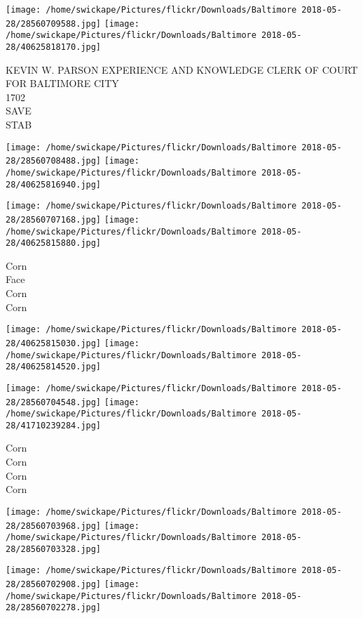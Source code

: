 \documentclass[10pt,letterpaper]{article}
\begin{document}
\texttt{[image: /home/swickape/Pictures/flickr/Downloads/Baltimore 2018-05-28/28560709588.jpg]}
\texttt{[image: /home/swickape/Pictures/flickr/Downloads/Baltimore 2018-05-28/40625818170.jpg]}

KEVIN W. PARSON EXPERIENCE AND KNOWLEDGE CLERK OF COURT FOR BALTIMORE CITY\\
1702\\
SAVE\\
STAB\\
\pagebreak

\texttt{[image: /home/swickape/Pictures/flickr/Downloads/Baltimore 2018-05-28/28560708488.jpg]}
\texttt{[image: /home/swickape/Pictures/flickr/Downloads/Baltimore 2018-05-28/40625816940.jpg]}

\texttt{[image: /home/swickape/Pictures/flickr/Downloads/Baltimore 2018-05-28/28560707168.jpg]}
\texttt{[image: /home/swickape/Pictures/flickr/Downloads/Baltimore 2018-05-28/40625815880.jpg]}

Corn\\
Face\\
Corn\\
Corn\\
\pagebreak

\texttt{[image: /home/swickape/Pictures/flickr/Downloads/Baltimore 2018-05-28/40625815030.jpg]}
\texttt{[image: /home/swickape/Pictures/flickr/Downloads/Baltimore 2018-05-28/40625814520.jpg]}

\texttt{[image: /home/swickape/Pictures/flickr/Downloads/Baltimore 2018-05-28/28560704548.jpg]}
\texttt{[image: /home/swickape/Pictures/flickr/Downloads/Baltimore 2018-05-28/41710239284.jpg]}

Corn\\
Corn\\
Corn\\
Corn\\
\pagebreak

\texttt{[image: /home/swickape/Pictures/flickr/Downloads/Baltimore 2018-05-28/28560703968.jpg]}
\texttt{[image: /home/swickape/Pictures/flickr/Downloads/Baltimore 2018-05-28/28560703328.jpg]}

\texttt{[image: /home/swickape/Pictures/flickr/Downloads/Baltimore 2018-05-28/28560702908.jpg]}
\texttt{[image: /home/swickape/Pictures/flickr/Downloads/Baltimore 2018-05-28/28560702278.jpg]}
\end{document}
